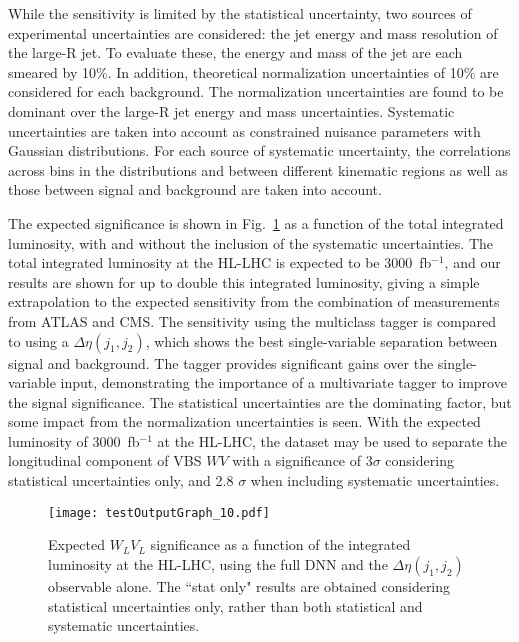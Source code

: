 \documentclass[amsmath,amssymb,aps,prd,preprint,groupedaddress]{revtex4-2}
\begin{document}
While the sensitivity is limited by the statistical uncertainty, two sources of experimental uncertainties are considered: the jet energy and mass resolution of the large-R jet.
To evaluate these, the energy and mass of the jet are each smeared by 10\%. In addition, theoretical normalization uncertainties of 10\% are considered for each background. The normalization uncertainties are found to be dominant over the large-R jet energy and mass uncertainties.
Systematic uncertainties are taken into account as constrained nuisance parameters with Gaussian distributions.  
For each source of systematic uncertainty, the correlations across bins in the distributions and between different kinematic regions as well as those between signal and background are taken into account.


The expected significance is shown in Fig.~\ref{fig:sensitivity} as a function of the total integrated luminosity, with and without the inclusion of the systematic uncertainties.
The total integrated luminosity at the HL-LHC is expected to be 3000~fb$^{-1}$, and our results are shown for up to double this integrated
luminosity, giving a simple extrapolation to the expected sensitivity from the combination of measurements from ATLAS and CMS.
The sensitivity using the multiclass tagger is compared to using a $\Delta \eta (j_{1}, j_{2})$, which shows the best single-variable separation between signal and background.
The tagger provides significant gains over the single-variable input, demonstrating the importance of a multivariate tagger to improve the signal significance. 
The statistical uncertainties are the dominating factor, but some impact from the normalization uncertainties is seen.
With the expected luminosity of 3000~fb$^{-1}$ at the HL-LHC, the dataset may be used to separate the longitudinal component of VBS $WV$ with a significance of $3 \sigma$ considering statistical uncertainties only, and 2.8 $\sigma$ when including systematic uncertainties.


\begin{figure}[thb]
  \centering
  \texttt{[image: testOutputGraph\_10.pdf]}
  \caption{Expected $W_{L}V_{L}$ significance as a function of the integrated luminosity at the HL-LHC, using the full DNN and the $\Delta \eta (j_{1}, j_{2})$ observable alone. The ``stat only" results are obtained considering statistical uncertainties only, rather than both statistical and systematic uncertainties.}
  \label{fig:sensitivity}
\end{figure}
 
\end{document}
